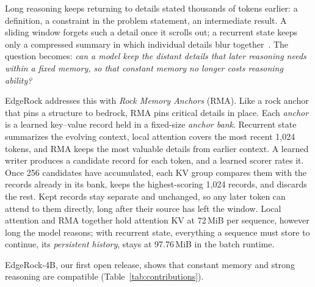 Long reasoning keeps returning to details stated thousands of tokens earlier: a definition, a constraint in the problem statement, an intermediate result. A sliding window forgets such a detail once it scrolls out; a recurrent state keeps only a compressed summary in which individual details blur together~\cite{repeatafterme}. The question becomes: \emph{can a model keep the distant details that later reasoning needs within a fixed memory, so that constant memory no longer costs reasoning ability?}

EdgeRock addresses this with \emph{Rock Memory Anchors} (RMA). Like a rock anchor that pins a structure to bedrock, RMA pins critical details in place. Each \emph{anchor} is a learned key--value record held in a fixed-size \emph{anchor bank}. Recurrent state summarizes the evolving context, local attention covers the most recent 1,024 tokens, and RMA keeps the most valuable details from earlier context. A learned writer produces a candidate record for each token, and a learned scorer rates it. Once 256 candidates have accumulated, each KV group compares them with the records already in its bank, keeps the highest-scoring 1,024 records, and discards the rest. Kept records stay separate and unchanged, so any later token can attend to them directly, long after their source has left the window. Local attention and RMA together hold attention KV at 72\,MiB per sequence, however long the model reasons; with recurrent state, everything a sequence must store to continue, its \emph{persistent history}, stays at 97.76\,MiB in the batch runtime.



EdgeRock-4B, our first open release, shows that constant memory and strong reasoning are compatible (Table~\ref{tab:contributions}).

